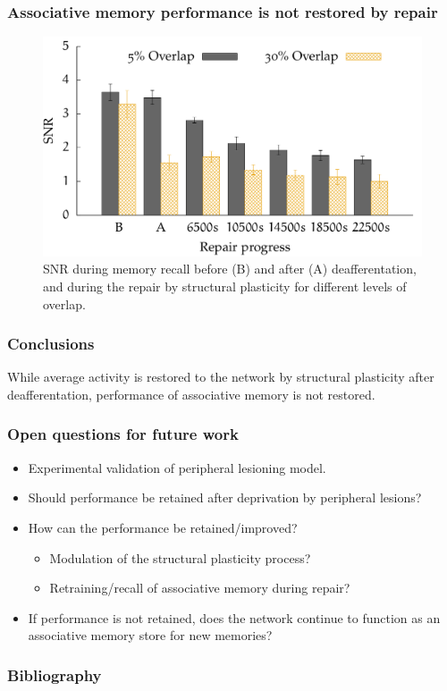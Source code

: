 \begin{frame}[c]
  \frametitle{Associative memory performance is not restored by repair}
  \begin{figure}[h]
    \centering
    \includegraphics[width=0.6\linewidth]{99_images/performance-during-repair}
    \caption{SNR during memory recall before (B) and after (A) deafferentation, and during the repair by structural plasticity for different levels of overlap.}
  \end{figure}
\end{frame}
\begin{frame}[c]
  \frametitle{Conclusions}
  While average activity is restored to the network by structural plasticity after deafferentation, \alert{performance of associative memory is not restored}.
\end{frame}
\begin{frame}[c]
  \frametitle{Open questions for future work}
  \begin{itemize}
    \item Experimental validation of peripheral lesioning model\footnotemark[4]{}.
    \item Should performance be retained after deprivation by peripheral lesions?
    \item How can the performance be retained/improved?
      \begin{itemize}
        \item Modulation of the structural plasticity process?
        \item Retraining/recall of associative memory during repair?
      \end{itemize}
    \item If performance is not retained, does the network continue to function as an associative memory store for new memories?
  \end{itemize}
\end{frame}
\begin{frame}[t,allowframebreaks]
  \frametitle{Bibliography}
  \printbibliography[heading=none]{}
\end{frame}



